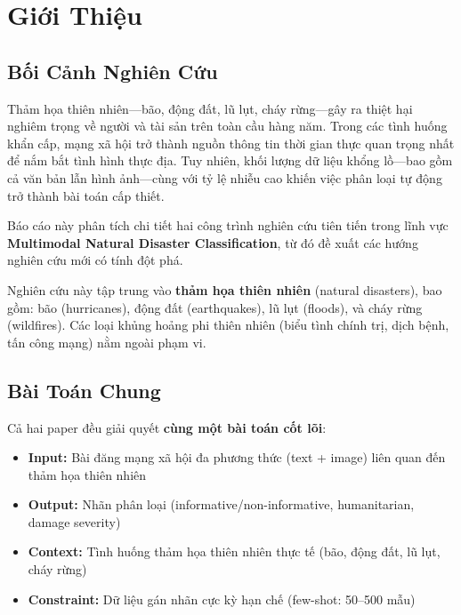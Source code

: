 \documentclass[12pt,a4paper]{article}
\begin{document}
\section{Giới Thiệu}

\subsection{Bối Cảnh Nghiên Cứu}

Thảm họa thiên nhiên—bão, động đất, lũ lụt, cháy rừng—gây ra thiệt hại nghiêm trọng về người và tài sản trên toàn cầu hàng năm. Trong các tình huống khẩn cấp, mạng xã hội trở thành nguồn thông tin thời gian thực quan trọng nhất để nắm bắt tình hình thực địa. Tuy nhiên, khối lượng dữ liệu khổng lồ—bao gồm cả văn bản lẫn hình ảnh—cùng với tỷ lệ nhiễu cao khiến việc phân loại tự động trở thành bài toán cấp thiết.

Báo cáo này phân tích chi tiết hai công trình nghiên cứu tiên tiến trong lĩnh vực \textbf{Multimodal Natural Disaster Classification}, từ đó đề xuất các hướng nghiên cứu mới có tính đột phá.

\begin{insightbox}
Nghiên cứu này tập trung vào \textbf{thảm họa thiên nhiên} (natural disasters), bao gồm: bão (hurricanes), động đất (earthquakes), lũ lụt (floods), và cháy rừng (wildfires). Các loại khủng hoảng phi thiên nhiên (biểu tình chính trị, dịch bệnh, tấn công mạng) nằm ngoài phạm vi.
\end{insightbox}

\subsection{Bài Toán Chung}

Cả hai paper đều giải quyết \textbf{cùng một bài toán cốt lõi}:

\begin{insightbox}
\begin{itemize}[leftmargin=*]
  \item \textbf{Input:} Bài đăng mạng xã hội đa phương thức (text + image) liên quan đến thảm họa thiên nhiên
  \item \textbf{Output:} Nhãn phân loại (informative/non-informative, humanitarian, damage severity)
  \item \textbf{Context:} Tình huống thảm họa thiên nhiên thực tế (bão, động đất, lũ lụt, cháy rừng)
  \item \textbf{Constraint:} Dữ liệu gán nhãn cực kỳ hạn chế (few-shot: 50--500 mẫu)
\end{itemize}
\end{insightbox}
\end{document}
